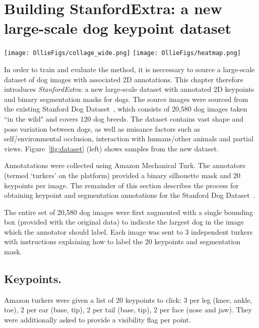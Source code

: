
\section{Building StanfordExtra: a new large-scale dog keypoint dataset}

\begin{figure*}[h]
    \centering
    \texttt{[image: OllieFigs/collage\_wide.png]}
    \texttt{[image: OllieFigs/heatmap.png]}
    \caption{\textbf{StanfordExtra example images}. \emph{Left}: outlined segmentations and labelled keypoints for 24 representative images. \emph{Right}: heatmap of deviation of worker submitted results from mean for each submission.}
    \label{fig:dataset}
\end{figure*}

In order to train and evaluate the method, it is neccessary to source a large-scale dataset of dog images with associated 2D annotations. This chapter therefore introduces \emph{StanfordExtra}: a new large-scale dataset with annotated 2D keypoints and binary segmentation masks for dogs. The source images were sourced from the existing Stanford Dog Dataset~\cite{StanfordDogs}, which consists of 20,580 dog images taken ``in the wild" and covers 120 dog breeds. The dataset contains vast shape and pose variation between dogs, as well as nuisance factors such as self/environmental occlusion, interaction with humans/other animals and partial views. Figure~\ref{fig:dataset} (left) shows samples from the new dataset.

Annotatations were collected using Amazon Mechanical Turk. The annotators (termed `turkers' on the platform) provided a binary silhouette mask and 20 keypoints per image. The remainder of this section describes the process for obtaining keypoint and segmentation annotations for the Stanford Dog Dataset~\cite{StanfordDogs}. 

The entire set of 20,580 dog images were first augmented with a single bounding box (provided with the original data) to indicate the largest dog in the image which the annotator should label. Each image was sent to 3 independent turkers with instructions explaining how to label the 20 keypoints and segmentation mask. 

\subsection{Keypoints.} 
Amazon turkers were given a list of 20 keypoints to click: 3 per leg (knee, ankle, toe), 2 per ear (base, tip), 2 per tail (base, tip), 2 per face (nose and jaw). They were additionally asked to provide a visibility flag per point. 

